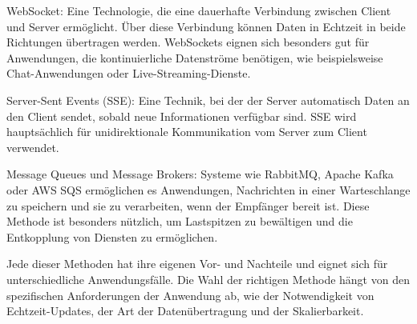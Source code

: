 WebSocket: Eine Technologie, die eine dauerhafte Verbindung zwischen Client und Server ermöglicht. Über diese Verbindung können Daten in Echtzeit in beide Richtungen übertragen werden. WebSockets eignen sich besonders gut für Anwendungen, die kontinuierliche Datenströme benötigen, wie beispielsweise Chat-Anwendungen oder Live-Streaming-Dienste.

Server-Sent Events (SSE): Eine Technik, bei der der Server automatisch Daten an den Client sendet, sobald neue Informationen verfügbar sind. SSE wird hauptsächlich für unidirektionale Kommunikation vom Server zum Client verwendet.

Message Queues und Message Brokers: Systeme wie RabbitMQ, Apache Kafka oder AWS SQS ermöglichen es Anwendungen, Nachrichten in einer Warteschlange zu speichern und sie zu verarbeiten, wenn der Empfänger bereit ist. Diese Methode ist besonders nützlich, um Lastspitzen zu bewältigen und die Entkopplung von Diensten zu ermöglichen.

Jede dieser Methoden hat ihre eigenen Vor- und Nachteile und eignet sich für unterschiedliche Anwendungsfälle. Die Wahl der richtigen Methode hängt von den spezifischen Anforderungen der Anwendung ab, wie der Notwendigkeit von Echtzeit-Updates, der Art der Datenübertragung und der Skalierbarkeit.
